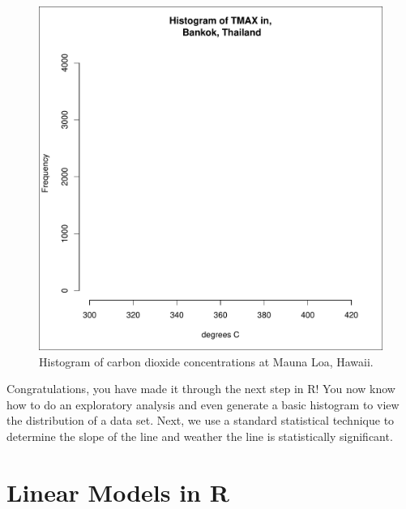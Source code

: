 \documentclass{article}\usepackage[]{graphicx}\usepackage[]{color}
\makeatletter
\def\maxwidth{ %
  \ifdim\Gin@nat@width>\linewidth
    \linewidth
  \else
    \Gin@nat@width
  \fi
}
\newenvironment{knitrout}{}{} %
\makeatother
\begin{document}
\begin{figure}\label{fig:histogram}
\caption{Histogram of carbon dioxide concentrations at Mauna Loa, Hawaii.}
\begin{center}

\begin{knitrout}
\color{fgcolor}
\includegraphics[width=\maxwidth]{figure/unnamed-chunk-12-1} 

\end{knitrout}
\end{center}
\end{figure}

Congratulations, you have made it through the next step in R!  You now know how to do an exploratory analysis and even generate a basic histogram to view the distribution of a data set. Next, we use a standard statistical technique to determine the slope of the line and weather the line is statistically significant.

\section{Linear Models in R}
\end{document}
